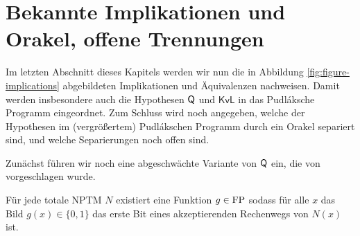 

\section{Bekannte Implikationen und Orakel, offene Trennungen}\label{sec:pudlak-overview}

Im letzten Abschnitt dieses Kapitels werden wir nun die in Abbildung \ref{fig:figure-implications} abgebildeten Implikationen und Äquivalenzen nachweisen.
Damit werden insbesondere auch die Hypothesen $\mathsf{Q}$ und $\mathsf{KvL}$ in das Pudláksche Programm eingeordnet.
Zum Schluss wird noch angegeben, welche der Hypothesen im (vergrößertem) Pudlákschen Programm durch ein Orakel separiert sind, und welche Separierungen noch offen sind.

Zunächst führen wir noch eine abgeschwächte Variante von $\mathsf{Q}$ ein, die von \textcite{fenner_inverting_2003} vorgeschlagen wurde.

\begin{conjecture}
    Für jede totale NPTM $N$ existiert eine Funktion $g\in\mathrm{FP}$ sodass für alle $x$ das Bild $g(x)\in\{0,1\}$ das erste Bit eines akzeptierenden Rechenwegs von $N(x)$ ist. 
\end{conjecture}

